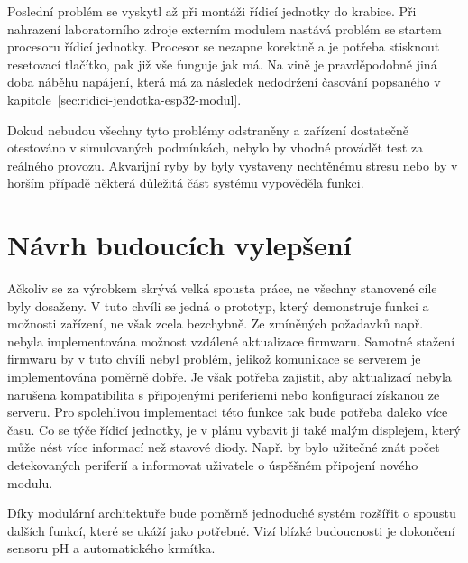     Poslední problém se vyskytl až při montáži řídicí jednotky do krabice. Při nahrazení laboratorního zdroje externím modulem nastává problém se startem procesoru řídicí jednotky. Procesor se nezapne korektně a je potřeba stisknout resetovací tlačítko, pak již vše funguje jak má. Na vině je pravděpodobně jiná doba náběhu napájení, která má za následek nedodržení časování popsaného v kapitole~\ref{sec:ridici-jendotka-esp32-modul}. 

    Dokud nebudou všechny tyto problémy odstraněny a zařízení dostatečně otestováno v simulovaných podmínkách, nebylo by vhodné provádět test za reálného provozu. Akvarijní ryby by byly vystaveny nechtěnému stresu nebo by v horším případě některá důležitá část systému vypověděla funkci. 

\section{Návrh budoucích vylepšení}
    Ačkoliv se za výrobkem skrývá velká spousta práce, ne všechny stanovené cíle byly dosaženy. V tuto chvíli se jedná o prototyp, který demonstruje funkci a možnosti zařízení, ne však zcela bezchybně. Ze zmíněných požadavků např. nebyla implementována možnost vzdálené aktualizace firmwaru. Samotné stažení firmwaru by v tuto chvíli nebyl problém, jelikož komunikace se serverem je  implementována poměrně dobře. Je však potřeba zajistit, aby aktualizací nebyla narušena kompatibilita s připojenými periferiemi nebo konfigurací získanou ze serveru. Pro spolehlivou implementaci této funkce tak bude potřeba daleko více času. Co se týče řídicí jednotky, je v plánu vybavit ji také malým displejem, který může nést více informací než stavové diody. Např. by bylo užitečné znát počet detekovaných periferií a informovat uživatele o úspěšném připojení nového modulu. 

    Díky modulární architektuře bude poměrně jednoduché systém rozšířit o spoustu dalších funkcí, které se ukáží jako potřebné. Vizí blízké budoucnosti je dokončení sensoru pH a automatického krmítka.